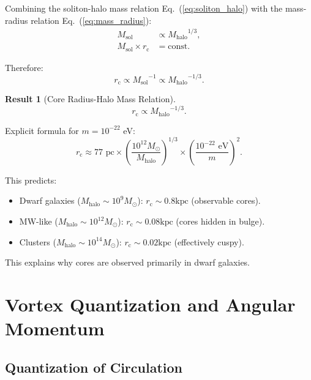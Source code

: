 \documentclass[11pt,a4paper]{article}
\newcommand{\Msun}{\ensuremath{M_\odot}}
\newcommand{\Msol}{\ensuremath{M_{\mathrm{sol}}}}
\newcommand{\Mhalo}{\ensuremath{M_{\mathrm{halo}}}}
\newcommand{\kpc}{\ensuremath{\mathrm{kpc}}}
\newcommand{\rc}{\ensuremath{r_{\mathrm{c}}}}
\theoremstyle{definition}
\newtheorem{result}{Result}[section]
\theoremstyle{remark}
\begin{document}
Combining the soliton-halo mass relation Eq.~(\ref{eq:soliton_halo}) with the mass-radius relation Eq.~(\ref{eq:mass_radius}):
\begin{align}
\Msol &\propto \Mhalo^{1/3}, \\
\Msol \times \rc &= \text{const}.
\end{align}

Therefore:
\begin{equation}
\rc \propto \Msol^{-1} \propto \Mhalo^{-1/3}.
\end{equation}

\begin{result}[Core Radius-Halo Mass Relation]
\begin{equation}
\boxed{\rc \propto \Mhalo^{-1/3}.}
\end{equation}

Explicit formula for $m = 10^{-22}$ eV:
\begin{equation}
\rc \approx 77 \text{ pc} \times \left(\frac{10^{12}\Msun}{\Mhalo}\right)^{1/3} \times \left(\frac{10^{-22}\text{ eV}}{m}\right)^2.
\end{equation}

This predicts:
\begin{itemize}[leftmargin=*]
\item Dwarf galaxies ($\Mhalo \sim 10^9 \Msun$): $\rc \sim 0.8 \kpc$ (observable cores).
\item MW-like ($\Mhalo \sim 10^{12} \Msun$): $\rc \sim 0.08 \kpc$ (cores hidden in bulge).
\item Clusters ($\Mhalo \sim 10^{14} \Msun$): $\rc \sim 0.02 \kpc$ (effectively cuspy).
\end{itemize}

This explains why cores are observed primarily in dwarf galaxies.
\end{result}

\section{Vortex Quantization and Angular Momentum}
\label{sec:vortices}

\subsection{Quantization of Circulation}
\label{sec:circulation}
\end{document}
